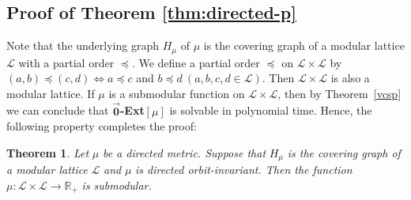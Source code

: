 \documentclass[11pt]{article}
\theoremstyle{definition}
\newtheorem{theorem}{Theorem}[section]
\begin{document}
\subsection{Proof of Theorem \ref{thm:directed-p}}
Note that the underlying graph $H_\mu$ of $\mu$ is the covering graph of a modular lattice $\mathcal{L}$ with a partial order $\preceq$. We define a partial order $\preceq$ on $\mathcal{L}\times \mathcal{L}$ by $(a,b)\preceq (c,d)\Longleftrightarrow a\preceq c$ and $b\preceq d\ (a,b,c,d\in \mathcal{L})$. Then $\mathcal{L}\times \mathcal{L}$ is also a modular lattice. If $\mu$ is a submodular function on $\mathcal{L}\times \mathcal{L}$, then by Theorem~\ref{vcsp} we can conclude that $\overrightarrow{\textbf{0}}$\textbf{-Ext}$[\mu]$ is solvable in polynomial time. Hence, the following property completes the proof:
\begin{theorem}
\textit{Let }$\mu$ \textit{be a directed metric. Suppose that }$H_\mu$ \textit{is the covering graph of a modular lattice }$\mathcal{L}$\textit{ and }$\mu$\textit{ is directed orbit-invariant. Then the function }$\mu:\mathcal{L}\times \mathcal{L}\rightarrow \mathbb{R}_+$\textit{ is submodular.}
\end{theorem}
\end{document}
